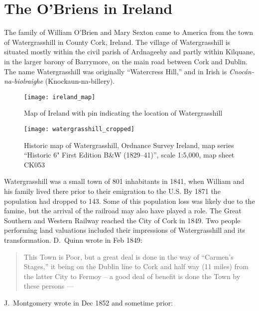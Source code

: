 \chapter{The O'Briens in Ireland}

The family of William O'Brien and Mary Sexton came to America from the town of Watergrasshill in County Cork, Ireland.\citep{Edward2OBrienNaturalization,Michael2OBrienNaturalization,Margaret3DooleyBaptism} The village of Watergrasshill is situated mostly within the civil parish of Ardnageehy and partly within Kilquane, in the larger barony of Barrymore, on the main road between Cork and Dublin.\citep{TopographicalDictionary} The name Watergrasshill was originally ``Watercress Hill,'' and in Irish is \textit{Cnoc\'{a}n-na-biolraighe} (Knockaun-na-billery).\citep{LocalNames}

\begin{figure}
	\centering
	\texttt{[image: ireland\_map]}
	\caption{Map of Ireland with pin indicating the location of Watergrasshill}
\end{figure}

\begin{figure}
	\centering
	\texttt{[image: watergrasshill\_cropped]}
	\caption{Historic map of Watergrasshill, Ordnance Survey Ireland, map series ``Historic 6" First Edition B\&W (1829--41)'', scale 1:5,000, map sheet CK053}
\end{figure}

Watergrasshill was a small town of 801 inhabitants in 1841, when William and his family lived there prior to their emigration to the U.S. By 1871 the population had dropped to 143.\citep{Population} Some of this population loss was likely due to the famine, but the arrival of the railroad may also have played a role. The Great Southern and Western Railway reached the City of Cork in 1849.\citep{Bianconi} Two people performing land valuations included their impressions of Watergrasshill and its transformation. D.\ Quinn wrote in Feb 1849:

\begin{quote}
	This Town is Poor, but a great deal is done in the way of ``Carmen's Stages,'' it being on the Dublin line to Cork and half way (11 miles) from the latter City to Fermoy -- a good deal of benefit is done the Town by these persons ---\citep{HouseIntro}
\end{quote}

J.\ Montgomery wrote in Dec 1852 and sometime prior:


